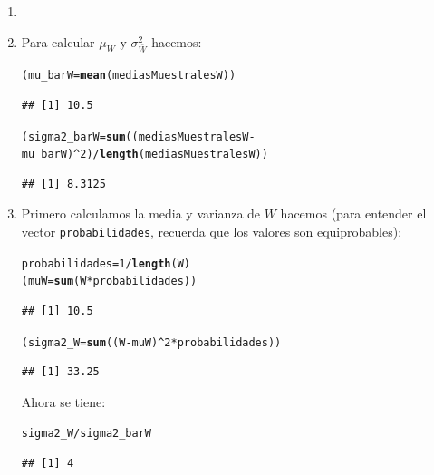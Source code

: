 \documentclass[10pt,a4paper]{article}\usepackage[]{graphicx}\usepackage[]{color}
\makeatletter
\newcommand{\hlnum}[1]{\textcolor[rgb]{0.686,0.059,0.569}{#1}}%
\newcommand{\hlopt}[1]{\textcolor[rgb]{0,0,0}{#1}}%
\newcommand{\hlstd}[1]{\textcolor[rgb]{0.345,0.345,0.345}{#1}}%
\newcommand{\hlkwb}[1]{\textcolor[rgb]{0.69,0.353,0.396}{#1}}%
\newcommand{\hlkwd}[1]{\textcolor[rgb]{0.737,0.353,0.396}{\textbf{#1}}}%
\newenvironment{kframe}{%
 \def\at@end@of@kframe{}%
 \ifinner\ifhmode%
  \def\at@end@of@kframe{\end{minipage}}%
  \begin{minipage}{\columnwidth}%
 \fi\fi%
 \def\FrameCommand##1{\hskip\@totalleftmargin \hskip-\fboxsep
 \colorbox{shadecolor}{##1}\hskip-\fboxsep
     \hskip-\linewidth \hskip-\@totalleftmargin \hskip\columnwidth}%
 \MakeFramed {\advance\hsize-\width
   \@totalleftmargin\z@ \linewidth\hsize
   \@setminipage}}%
 {\par\unskip\endMakeFramed%
 \at@end@of@kframe}
\newenvironment{knitrout}{}{} %
\makeatother
\begin{document}
    \begin{enumerate}
        \item[]
        \item Para calcular $\mu_{\bar W}$ y $\sigma^2_{\bar W}$ hacemos:
\begin{knitrout}
\color{fgcolor}\begin{kframe}
\begin{alltt}
\hlstd{(mu_barW} \hlkwb{=} \hlkwd{mean}\hlstd{(mediasMuestralesW))}
\end{alltt}
\begin{verbatim}
## [1] 10.5
\end{verbatim}
\begin{alltt}
\hlstd{(sigma2_barW} \hlkwb{=} \hlkwd{sum}\hlstd{((mediasMuestralesW} \hlopt{-} \hlstd{mu_barW)}\hlopt{^}\hlnum{2}\hlstd{)} \hlopt{/} \hlkwd{length}\hlstd{(mediasMuestralesW))}
\end{alltt}
\begin{verbatim}
## [1] 8.3125
\end{verbatim}
\end{kframe}
\end{knitrout}
        \item Primero calculamos la media y varianza de $W$ hacemos (para entender el vector {\tt probabilidades}, recuerda que los valores son equiprobables):
\begin{knitrout}
\color{fgcolor}\begin{kframe}
\begin{alltt}
\hlstd{probabilidades} \hlkwb{=} \hlnum{1} \hlopt{/} \hlkwd{length}\hlstd{(W)}
\hlstd{(muW} \hlkwb{=} \hlkwd{sum}\hlstd{(W} \hlopt{*} \hlstd{probabilidades))}
\end{alltt}
\begin{verbatim}
## [1] 10.5
\end{verbatim}
\begin{alltt}
\hlstd{(sigma2_W} \hlkwb{=} \hlkwd{sum}\hlstd{((W} \hlopt{-} \hlstd{muW)}\hlopt{^}\hlnum{2} \hlopt{*} \hlstd{probabilidades ))}
\end{alltt}
\begin{verbatim}
## [1] 33.25
\end{verbatim}
\end{kframe}
\end{knitrout}
            Ahora se tiene:
\begin{knitrout}
\color{fgcolor}\begin{kframe}
\begin{alltt}
\hlstd{sigma2_W} \hlopt{/} \hlstd{sigma2_barW}
\end{alltt}
\begin{verbatim}
## [1] 4
\end{verbatim}
\end{kframe}
\end{knitrout}

    \end{enumerate}
\end{document}
